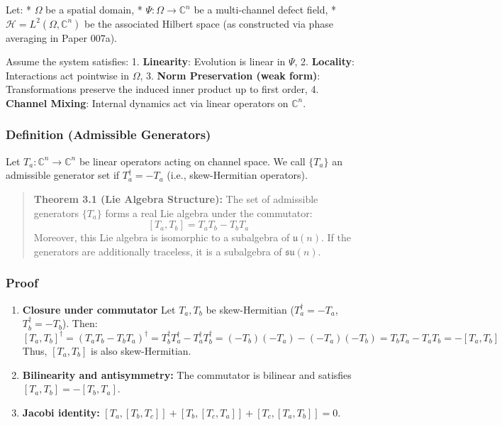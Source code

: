 \documentclass[
]{article}
\begin{document}
Let: * \(\Omega\) be a spatial domain, *
\(\Psi : \Omega \to \mathbb{C}^n\) be a multi-channel defect field, *
\(\mathcal{H} = L^2(\Omega, \mathbb{C}^n)\) be the associated Hilbert
space (as constructed via phase averaging in Paper 007a).

Assume the system satisfies: 1. \textbf{Linearity}: Evolution is linear
in \(\Psi\), 2. \textbf{Locality}: Interactions act pointwise in
\(\Omega\), 3. \textbf{Norm Preservation (weak form)}: Transformations
preserve the induced inner product up to first order, 4. \textbf{Channel
Mixing}: Internal dynamics act via linear operators on \(\mathbb{C}^n\).

\subsubsection{Definition (Admissible
Generators)}\label{definition-admissible-generators-1}

Let \(T_a : \mathbb{C}^n \to \mathbb{C}^n\) be linear operators acting
on channel space. We call \(\{T_a\}\) an admissible generator set if
\(T_a^\dagger = -T_a\) (i.e., skew-Hermitian operators).

\begin{quote}
\textbf{Theorem 3.1 (Lie Algebra Structure):} The set of admissible
generators \(\{T_a\}\) forms a real Lie algebra under the commutator:
\[ [T_a, T_b] = T_a T_b - T_b T_a \] Moreover, this Lie algebra is
isomorphic to a subalgebra of \(\mathfrak{u}(n)\). If the generators are
additionally traceless, it is a subalgebra of \(\mathfrak{su}(n)\).
\end{quote}

\subsubsection{Proof}\label{proof-2}

\begin{enumerate}
\def\labelenumi{\arabic{enumi}.}
\item
  \textbf{Closure under commutator} Let \(T_a, T_b\) be skew-Hermitian
  (\(T_a^\dagger = -T_a\), \(T_b^\dagger = -T_b\)). Then:
  \[ [T_a, T_b]^\dagger = (T_a T_b - T_b T_a)^\dagger = T_b^\dagger T_a^\dagger - T_a^\dagger T_b^\dagger = (-T_b)(-T_a) - (-T_a)(-T_b) = T_b T_a - T_a T_b = -[T_a, T_b] \]
  Thus, \([T_a, T_b]\) is also skew-Hermitian.
\item
  \textbf{Bilinearity and antisymmetry:} The commutator is bilinear and
  satisfies \([T_a, T_b] = -[T_b, T_a]\).
\item
  \textbf{Jacobi identity:}
  \([T_a,[T_b,T_c]] + [T_b,[T_c,T_a]] + [T_c,[T_a,T_b]] = 0\).
\end{enumerate}
\end{document}
